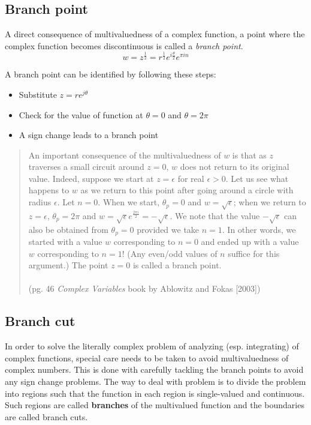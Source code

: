 \documentclass[letterpaper,11pt]{article}
\begin{document}
\subsection*{Branch point} 

A direct consequence of multivaluedness of a complex function, a point where the complex function becomes discontinuous is called a \emph{branch point}.
\begin{equation}
w = z^\frac{1}{2} = r^\frac{1}{2} e^{i \frac{\theta}{2}}e^{\pi i n} 
\end{equation}

A branch point can be identified by following these steps:
\begin{itemize}
\item Substitute $ z = r e^{j \theta}$
\item Check for the value of function at $ \theta = 0$ and $ \theta = 2 \pi$ 
\item A sign change leads to a branch point
\end{itemize}
\begin{quotation}
An important consequence of the multivaluedness of $w$ is that as $z$ traverses
a small circuit around $z = 0$, $w$ does not return to its original value. Indeed,
suppose we start at $ z = \epsilon$ for real $\epsilon > 0$. Let us see what happens to $w$ as
we return to this point after going around a circle with radius $\epsilon$. Let $n = 0$.
When we start, $\theta_p = 0$ and $w = \sqrt{\epsilon}$;
when we return to $z = \epsilon$, $\theta_p = 2\pi$ and
$ w = \sqrt{\epsilon} e^{\frac{2\pi i}{2}} =  − \sqrt{\epsilon}$.
We note that the value $− \sqrt{\epsilon}$ can also be obtained from
$\theta_p = 0$ provided we take $n = 1$. In other words, we started with a value $w$
corresponding to $n = 0$ and ended up with a value $w$ corresponding to $n = 1!$
(Any even/odd values of $n$ suffice for this argument.) The point $z = 0$ is called
a branch point. \\ \\
(pg. 46 \emph{Complex Variables} book by Ablowitz and Fokas [2003])
\end{quotation}


\subsection*{Branch cut} 

In order to solve the literally complex problem of analyzing (esp. integrating) of complex functions, special care needs to be taken to avoid multivaluedness of complex numbers. This is done with carefully tackling the branch points to avoid any sign change problems. The way to deal with problem is to divide the problem into regions such that the function in each region is single-valued and continuous. Such regions are called \textbf{branches} of the multivalued function and the boundaries are called branch cuts.
\end{document}
